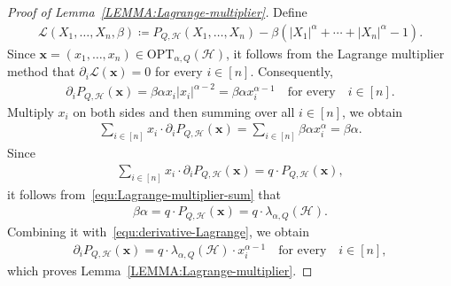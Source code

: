 \documentclass[11pt,a4paper]{article}
\begin{document}
\begin{proof}[Proof of Lemma~\ref{LEMMA:Lagrange-multiplier}]
    Define 
    \begin{align*}
        \mathcal{L}(X_1, \ldots, X_n, \beta)
        \coloneqq P_{Q, \mathcal{H}}(X_1, \ldots, X_n) - \beta  \left(|X_{1}|^{\alpha} + \cdots + |X_{n}|^{\alpha} - 1\right). 
    \end{align*}
    Since $\mathbf{x} = (x_1, \ldots, x_n) \in \mathrm{OPT}_{\alpha, Q}(\mathcal{H})$, it follows from the Lagrange multiplier method that $\partial_{i} \mathcal{L}(\mathbf{x}) = 0$ for every $i \in [n]$.
    Consequently,
    \begin{align}\label{equ:derivative-Lagrange}
        \partial_{i} P_{Q, \mathcal{H}}(\mathbf{x}) 
        = \beta \alpha x_i |x_{i}|^{\alpha-2} 
        = \beta \alpha x_i^{\alpha-1} 
        \quad\text{for every}\quad i \in [n]. 
    \end{align}
    Multiply $x_i$ on both sides and then summing over all $i \in [n]$, we obtain 
    \begin{align}\label{equ:Lagrange-multiplier-sum}
        \sum_{i \in [n]} x_i \cdot \partial_{i} P_{Q, \mathcal{H}}(\mathbf{x}) 
        = \sum_{i \in [n]} \beta \alpha x_i^{\alpha}
        = \beta \alpha.
    \end{align}
    Since 
    \begin{align*}
        \sum_{i \in [n]} x_i \cdot \partial_{i} P_{Q, \mathcal{H}}(\mathbf{x}) 
        = q \cdot P_{Q, \mathcal{H}}(\mathbf{x}),
    \end{align*}
    it follows from~\eqref{equ:Lagrange-multiplier-sum} that 
    \begin{align*}
        \beta \alpha
        = q \cdot P_{Q, \mathcal{H}}(\mathbf{x})
        = q\cdot \lambda_{\alpha,Q}(\mathcal{H}). 
    \end{align*}
    Combining it with~\eqref{equ:derivative-Lagrange}, we obtain 
    \begin{align*}
        \partial_{i} P_{Q, \mathcal{H}}(\mathbf{x})
        = q\cdot \lambda_{\alpha,Q}(\mathcal{H}) \cdot x_i^{\alpha-1}
        \quad\text{for every}\quad i \in [n], 
    \end{align*}
    which proves Lemma~\ref{LEMMA:Lagrange-multiplier}. 
\end{proof}%
\end{document}
